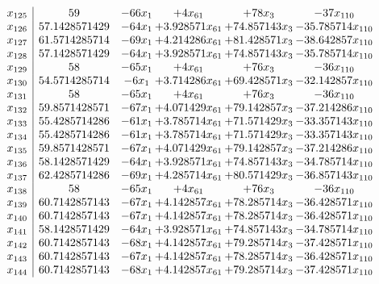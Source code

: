 \documentclass[11pt]{article}
\begin{document}
\[\begin{array}{c| c c@{\hskip 2pt} c@{\hskip 2pt} c@{\hskip 2pt} c@{\hskip 2pt} }
 x_{125}   &  59 & -66 x_{1} & + 4 x_{61} & + 78 x_{3} & -37 x_{110}\\
 x_{126}   &  57.1428571429 & -64 x_{1} & + 3.928571 x_{61} & + 74.857143 x_{3} & -35.785714 x_{110}\\
 x_{127}   &  61.5714285714 & -69 x_{1} & + 4.214286 x_{61} & + 81.428571 x_{3} & -38.642857 x_{110}\\
 x_{128}   &  57.1428571429 & -64 x_{1} & + 3.928571 x_{61} & + 74.857143 x_{3} & -35.785714 x_{110}\\
 x_{129}   &  58 & -65 x_{1} & + 4 x_{61} & + 76 x_{3} & -36 x_{110}\\
 x_{130}   &  54.5714285714 & -6 x_{1} & + 3.714286 x_{61} & + 69.428571 x_{3} & -32.142857 x_{110}\\
 x_{131}   &  58 & -65 x_{1} & + 4 x_{61} & + 76 x_{3} & -36 x_{110}\\
 x_{132}   &  59.8571428571 & -67 x_{1} & + 4.071429 x_{61} & + 79.142857 x_{3} & -37.214286 x_{110}\\
 x_{133}   &  55.4285714286 & -61 x_{1} & + 3.785714 x_{61} & + 71.571429 x_{3} & -33.357143 x_{110}\\
 x_{134}   &  55.4285714286 & -61 x_{1} & + 3.785714 x_{61} & + 71.571429 x_{3} & -33.357143 x_{110}\\
 x_{135}   &  59.8571428571 & -67 x_{1} & + 4.071429 x_{61} & + 79.142857 x_{3} & -37.214286 x_{110}\\
 x_{136}   &  58.1428571429 & -64 x_{1} & + 3.928571 x_{61} & + 74.857143 x_{3} & -34.785714 x_{110}\\
 x_{137}   &  62.4285714286 & -69 x_{1} & + 4.285714 x_{61} & + 80.571429 x_{3} & -36.857143 x_{110}\\
 x_{138}   &  58 & -65 x_{1} & + 4 x_{61} & + 76 x_{3} & -36 x_{110}\\
 x_{139}   &  60.7142857143 & -67 x_{1} & + 4.142857 x_{61} & + 78.285714 x_{3} & -36.428571 x_{110}\\
 x_{140}   &  60.7142857143 & -67 x_{1} & + 4.142857 x_{61} & + 78.285714 x_{3} & -36.428571 x_{110}\\
 x_{141}   &  58.1428571429 & -64 x_{1} & + 3.928571 x_{61} & + 74.857143 x_{3} & -34.785714 x_{110}\\
 x_{142}   &  60.7142857143 & -68 x_{1} & + 4.142857 x_{61} & + 79.285714 x_{3} & -37.428571 x_{110}\\
 x_{143}   &  60.7142857143 & -67 x_{1} & + 4.142857 x_{61} & + 78.285714 x_{3} & -36.428571 x_{110}\\
 x_{144}   &  60.7142857143 & -68 x_{1} & + 4.142857 x_{61} & + 79.285714 x_{3} & -37.428571 x_{110}\\

\end{array}\]
\end{document}
